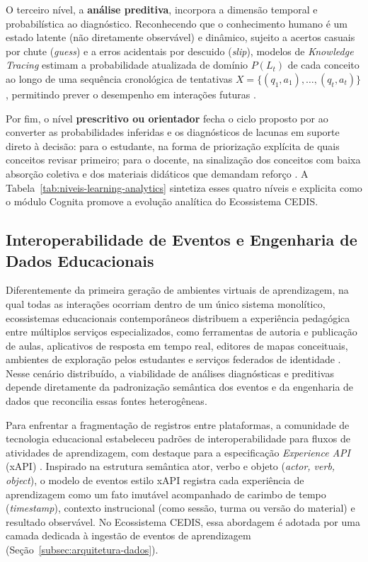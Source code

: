 O terceiro nível, a \textbf{análise preditiva}, incorpora a dimensão temporal e probabilística ao diagnóstico. Reconhecendo que o conhecimento humano é um estado latente (não diretamente observável) e dinâmico, sujeito a acertos casuais por chute (\textit{guess}) e a erros acidentais por descuido (\textit{slip}), modelos de \textit{Knowledge Tracing} estimam a probabilidade atualizada de domínio $P(L_t)$ de cada conceito ao longo de uma sequência cronológica de tentativas $X = \{(q_1, a_1), \ldots, (q_t, a_t)\}$, permitindo prever o desempenho em interações futuras \cite{corbett_knowledge_1994, pelanek_bayesian_2017}.

Por fim, o nível \textbf{prescritivo ou orientador} fecha o ciclo proposto por  ao converter as probabilidades inferidas e os diagnósticos de lacunas em suporte direto à decisão: para o estudante, na forma de priorização explícita de quais conceitos revisar primeiro; para o docente, na sinalização dos conceitos com baixa absorção coletiva e dos materiais didáticos que demandam reforço \cite{liao_naviedu_2026}. A Tabela~\ref{tab:niveis-learning-analytics} sintetiza esses quatro níveis e explicita como o módulo Cognita promove a evolução analítica do Ecossistema CEDIS.



\subsection{Interoperabilidade de Eventos e Engenharia de Dados Educacionais}
\label{subsec:interoperabilidade-la}

Diferentemente da primeira geração de ambientes virtuais de aprendizagem, na qual todas as interações ocorriam dentro de um único sistema monolítico, ecossistemas educacionais contemporâneos distribuem a experiência pedagógica entre múltiplos serviços especializados, como ferramentas de autoria e publicação de aulas, aplicativos de resposta em tempo real, editores de mapas conceituais, ambientes de exploração pelos estudantes e serviços federados de identidade \cite{lang_handbook_2017, richards_fundamentals_2020}. Nesse cenário distribuído, a viabilidade de análises diagnósticas e preditivas depende diretamente da padronização semântica dos eventos e da engenharia de dados que reconcilia essas fontes heterogêneas.

Para enfrentar a fragmentação de registros entre plataformas, a comunidade de tecnologia educacional estabeleceu padrões de interoperabilidade para fluxos de atividades de aprendizagem, com destaque para a especificação \textit{Experience API} (xAPI) \cite{lang_handbook_2017}. Inspirado na estrutura semântica ator, verbo e objeto (\textit{actor, verb, object}), o modelo de eventos estilo xAPI registra cada experiência de aprendizagem como um fato imutável acompanhado de carimbo de tempo (\textit{timestamp}), contexto instrucional (como sessão, turma ou versão do material) e resultado observável. No Ecossistema CEDIS, essa abordagem é adotada por uma camada dedicada à ingestão de eventos de aprendizagem (Seção~\ref{subsec:arquitetura-dados}).

